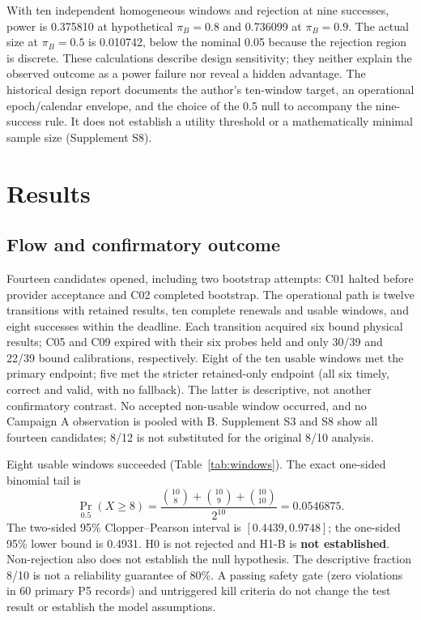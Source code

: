 \documentclass[pdflatex,sn-mathphys-num]{sn-jnl}
\begin{document}
With ten independent homogeneous windows and rejection at nine successes, power is 0.375810 at hypothetical $\pi_B=0.8$ and 0.736099 at $\pi_B=0.9$. The actual size at $\pi_B=0.5$ is 0.010742, below the nominal 0.05 because the rejection region is discrete. These calculations describe design sensitivity; they neither explain the observed outcome as a power failure nor reveal a hidden advantage. The historical design report documents the author's ten-window target, an operational epoch/calendar envelope, and the choice of the 0.5 null to accompany the nine-success rule. It does not establish a utility threshold or a mathematically minimal sample size (Supplement S8).

\section{Results}
\subsection{Flow and confirmatory outcome}
Fourteen candidates opened, including two bootstrap attempts: C01 halted before provider acceptance and C02 completed bootstrap. The operational path is twelve transitions with retained results, ten complete renewals and usable windows, and eight successes within the deadline. Each transition acquired six bound physical results; C05 and C09 expired with their six probes held and only 30/39 and 22/39 bound calibrations, respectively. Eight of the ten usable windows met the primary endpoint; five met the stricter retained-only endpoint (all six timely, correct and valid, with no fallback). The latter is descriptive, not another confirmatory contrast. No accepted non-usable window occurred, and no Campaign A observation is pooled with B. Supplement S3 and S8 show all fourteen candidates; 8/12 is not substituted for the original 8/10 analysis.

Eight usable windows succeeded (Table~\ref{tab:windows}). The exact one-sided binomial tail is
\[
\Pr_{0.5}(X\geq8)=\frac{\binom{10}{8}+\binom{10}{9}+\binom{10}{10}}{2^{10}}=0.0546875.
\]
The two-sided 95\% Clopper--Pearson interval \cite{clopper1934} is $[0.4439,0.9748]$; the one-sided 95\% lower bound is 0.4931. H0 is not rejected and H1-B is \textbf{not established}. Non-rejection also does not establish the null hypothesis. The descriptive fraction 8/10 is not a reliability guarantee of 80\%. A passing safety gate (zero violations in 60 primary P5 records) and untriggered kill criteria do not change the test result or establish the model assumptions.
\end{document}
